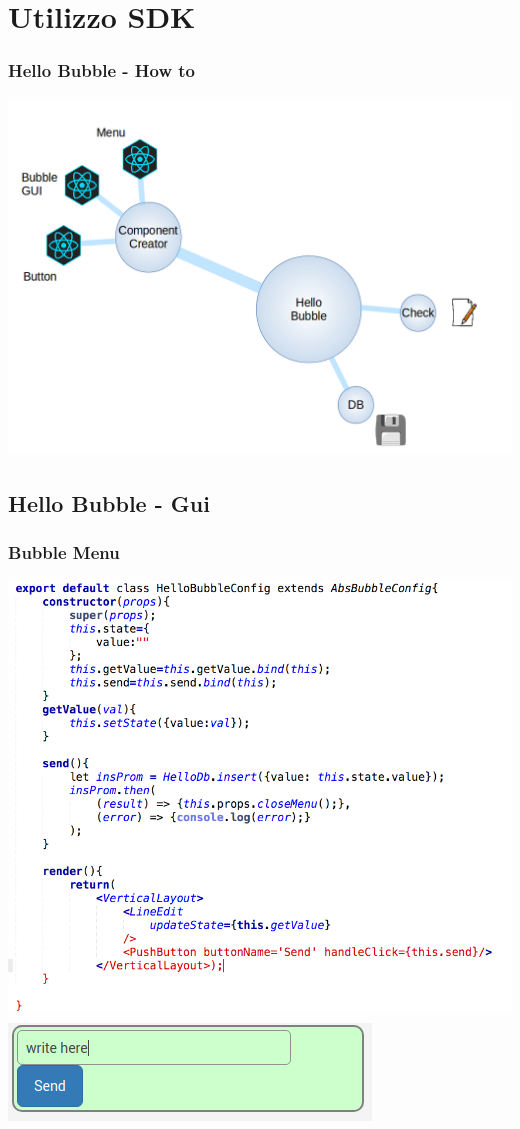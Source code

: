 \section{Utilizzo SDK}
\begin{frame}
	\frametitle{Hello Bubble - How to}
	\begin{center}
	\includegraphics[scale=0.30]{code/bubbleMap.png}
	\end{center}
\end{frame}

\subsection{Hello Bubble - Gui}
\begin{frame}[fragile]
	\frametitle{Bubble Menu}
	\begin{center}
	\includegraphics[width=.5\textwidth]{code/hellobubbleconfig.png}
	\vfill
	{
	\vfill
	\includegraphics[width=.3\textwidth]{code/config.png}
	\vfill
	}
	\end{center}
\end{frame}

